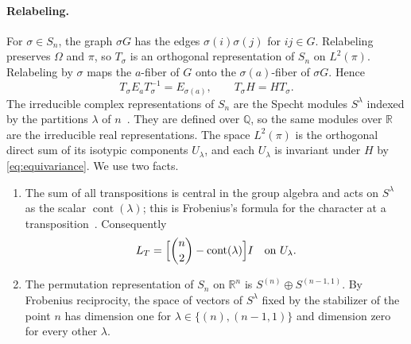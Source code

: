 \paragraph{Relabeling.}
For $\sigma\in S_n$, the graph $\sigma G$ has the edges $\sigma(i)\sigma(j)$
for $ij\in G$. Relabeling preserves $\Omega$ and $\pi$, so $T_\sigma$ is an
orthogonal representation of $S_n$ on $L^2(\pi)$. Relabeling by $\sigma$ maps
the $a$-fiber of $G$ onto the $\sigma(a)$-fiber of $\sigma G$. Hence
\begin{equation}\label{eq:equivariance}
 T_\sigma E_aT_\sigma^{-1}=E_{\sigma(a)},\qquad T_\sigma H=HT_\sigma .
\end{equation}
The irreducible complex representations of $S_n$ are the Specht modules
$S^\lambda$ indexed by the partitions $\lambda$ of
$n$~\cite[Theorem~2.4.6]{Sagan01}. They are defined over $\mathbb Q$, so the
same modules over $\mathbb R$ are the irreducible real representations. The space $L^2(\pi)$ is the orthogonal
direct sum of its isotypic components $U_\lambda$, and each $U_\lambda$ is
invariant under $H$ by \eqref{eq:equivariance}. We use two facts.
\begin{enumerate}
\item The sum of all transpositions is central in the group algebra and acts
on $S^\lambda$ as the scalar $\operatorname{cont}(\lambda)$; this is
Frobenius's formula for the character at a
transposition~\cite[Lemma~7]{DS81}. Consequently
\begin{equation}\label{eq:content}
 L_T=\Bigl[\binom n2-\operatorname{cont}(\lambda)\Bigr]I
 \quad\text{on }U_\lambda .
\end{equation}
\item The permutation representation of $S_n$ on $\mathbb R^n$ is
$S^{(n)}\oplus S^{(n-1,1)}$. By Frobenius reciprocity, the space of vectors of
$S^\lambda$ fixed by the stabilizer of the point $n$ has dimension one for
$\lambda\in\{(n),(n-1,1)\}$ and dimension zero for every other $\lambda$.
\end{enumerate}
